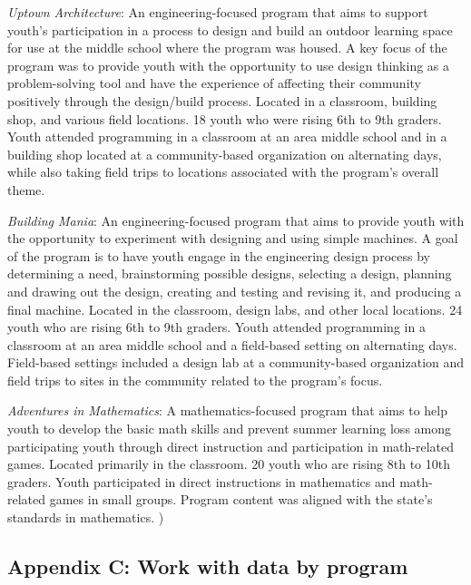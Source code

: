 \documentclass[]{msu-thesis}
\theoremstyle{definition}
\theoremstyle{definition}
\theoremstyle{definition}
\theoremstyle{remark}
\begin{document}
\emph{Uptown Architecture}: An engineering-focused program that aims to
support youth's participation in a process to design and build an
outdoor learning space for use at the middle school where the program
was housed. A key focus of the program was to provide youth with the
opportunity to use design thinking as a problem-solving tool and have
the experience of affecting their community positively through the
design/build process. Located in a classroom, building shop, and various
field locations. 18 youth who were rising 6th to 9th graders. Youth
attended programming in a classroom at an area middle school and in a
building shop located at a community-based organization on alternating
days, while also taking field trips to locations associated with the
program's overall theme.

\emph{Building Mania}: An engineering-focused program that aims to
provide youth with the opportunity to experiment with designing and
using simple machines. A goal of the program is to have youth engage in
the engineering design process by determining a need, brainstorming
possible designs, selecting a design, planning and drawing out the
design, creating and testing and revising it, and producing a final
machine. Located in the classroom, design labs, and other local
locations. 24 youth who are rising 6th to 9th graders. Youth attended
programming in a classroom at an area middle school and a field-based
setting on alternating days. Field-based settings included a design lab
at a community-based organization and field trips to sites in the
community related to the program's focus.

\emph{Adventures in Mathematics}: A mathematics-focused program that
aims to help youth to develop the basic math skills and prevent summer
learning loss among participating youth through direct instruction and
participation in math-related games. Located primarily in the classroom.
20 youth who are rising 8th to 10th graders. Youth participated in
direct instructions in mathematics and math-related games in small
groups. Program content was aligned with the state's standards in
mathematics. )

\subsection{Appendix C: Work with data by
program}\label{appendix-c-work-with-data-by-program}
\end{document}
